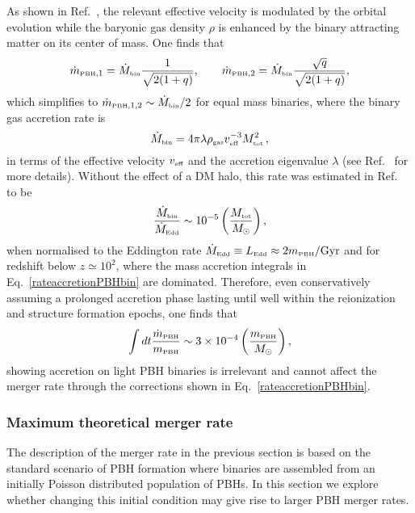 \documentclass[11pt,a4paper]{article}
\newcommand{\be}{\begin{equation}}
\newcommand{\ee}{\end{equation}}
\newcommand{\lp }{\left (}
\newcommand{\rp }{\right )}
\newcommand{\PBH}{\text{\tiny PBH}}
\begin{document}
As shown in Ref.~\cite{DeLuca:2020qqa}, the relevant effective velocity is modulated by the orbital evolution while the baryonic gas density $\rho$ is enhanced by the binary attracting matter on its center of mass. One finds that 
\begin{align}
\dot m_{\PBH,1} = \dot M_\text{\tiny bin}  \frac{1}{\sqrt{2 (1+q)}}, 
	\qquad
\dot m_{\PBH,2} = \dot M_\text{\tiny bin}  \frac{\sqrt{q} }{\sqrt{2 (1+q)}}, 
\label{M1M2dotFIN}
\end{align}
which simplifies to $\dot m_{\PBH,1,2} 
\sim \dot M_\text{\tiny bin}/2 $ 
for equal mass binaries, where the binary gas accretion rate is
\be \label{R1bin}
\dot M_\text{\tiny bin} = 4 \pi \lambda \rho_\text{\tiny gas} v^{-3}_\text{\tiny eff} M^2_\text{\tiny tot}\,,
\ee
in terms of the effective velocity $v_\text{\tiny eff}$ and the accretion eigenvalue $\lambda$ (see Ref.~\cite{Ricotti:2007au} for more details).
Without the effect of a DM halo, this rate was estimated in Ref.~\cite{Ali-Haimoud:2016mbv} to be
\begin{equation}
\frac{\dot M_\text{\tiny bin}}{\dot M_\text{\tiny Edd}} \sim 10^{-5} \lp \frac{M_\text{\tiny tot}}{M_{\odot}}\rp,
\end{equation}
when normalised to the Eddington rate $\dot{M}_\text{\tiny Edd} \equiv L_\text{\tiny Edd} \approx 2 m_\PBH / \text{Gyr}$ and for redshift below $z\simeq 10^2$, where the mass accretion integrals in Eq.~\eqref{rateaccretionPBHbin} are dominated.
Therefore, even conservatively assuming a prolonged accretion phase lasting until well within the reionization and structure formation epochs, one finds that
\begin{equation}
\int dt \frac{\dot{m}_\PBH}{{m}_\PBH} \sim 3 \times 10^{-4}  \lp \frac{{m}_\PBH}{M_{\odot}} \rp,	
\end{equation}
showing accretion on light PBH binaries is irrelevant and cannot affect the merger rate through the corrections shown in Eq.~\eqref{rateaccretionPBHbin}. 


\subsubsection{Maximum theoretical merger rate}\label{sec:clustering}

The description of the merger rate in the previous section is based 
on the standard scenario of PBH formation where binaries are assembled from an initially Poisson distributed population of PBHs. 
In this section we explore whether changing this initial condition may give rise to larger PBH merger rates. 
\end{document}
